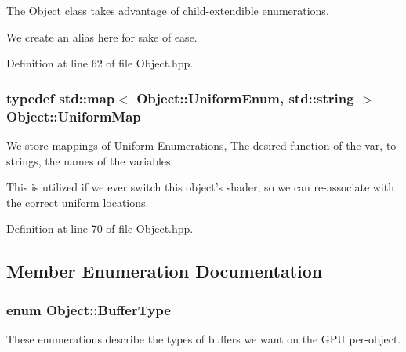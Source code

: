 The \hyperlink{class_object}{Object} class takes advantage of child-\/extendible enumerations. 

We create an alias here for sake of ease. 

Definition at line 62 of file Object.\-hpp.

\hypertarget{class_object_a6e19bd8516360bff956408cbae33b878}{
\subsubsection[{Uniform\-Map}]{\setlength{\rightskip}{0pt plus 5cm}typedef std\-::map$<$ {\bf Object\-::\-Uniform\-Enum}, std\-::string $>$ {\bf Object\-::\-Uniform\-Map}}}\label{class_object_a6e19bd8516360bff956408cbae33b878}


We store mappings of Uniform Enumerations, The desired function of the var, to strings, the names of the variables. 

This is utilized if we ever switch this object's shader, so we can re-\/associate with the correct uniform locations. 

Definition at line 70 of file Object.\-hpp.



\subsection{Member Enumeration Documentation}
\hypertarget{class_object_a51d08da3bd559d08734197006bc29a79}{
\subsubsection[{Buffer\-Type}]{\setlength{\rightskip}{0pt plus 5cm}enum {\bf Object\-::\-Buffer\-Type}\hspace{0.3cm}{\ttfamily [private]}}}\label{class_object_a51d08da3bd559d08734197006bc29a79}


These enumerations describe the types of buffers we want on the G\-P\-U per-\/object. 

